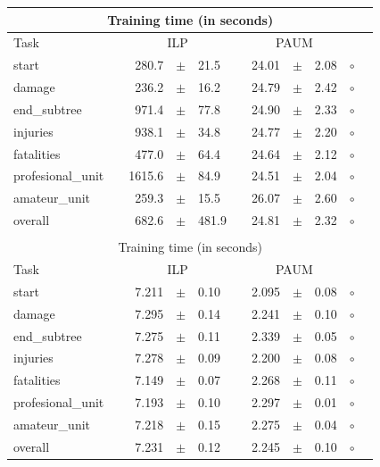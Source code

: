 \begin{table}
\centering 
\begin{tabular}
{lcrclcrcl@{\hspace{0.1cm}}cc}

\multicolumn{11}{c}{Training time (in seconds)}\\
\hline
Task && \multicolumn{3}{c}{ILP}  && \multicolumn{3}{c}{PAUM} && \\
\hline
start              &  & 280.7 &  $\pm$  & 21.5 &  & 24.01 &  $\pm$  & 2.08 &  $\circ$\\
damage             &  & 236.2 &  $\pm$  & 16.2 &  & 24.79 &  $\pm$  & 2.42 &  $\circ$\\
end\_subtree       &  & 971.4 &  $\pm$  & 77.8 &  & 24.90 &  $\pm$  & 2.33 &  $\circ$\\
injuries           &  & 938.1 &  $\pm$  & 34.8 &  & 24.77 &  $\pm$  & 2.20 &  $\circ$\\
fatalities         &  & 477.0 &  $\pm$  & 64.4 &  & 24.64 &  $\pm$  & 2.12 &  $\circ$\\
profesional\_unit  &  & 1615.6 &  $\pm$ & 84.9 &  & 24.51 &  $\pm$  & 2.04 &  $\circ$\\
amateur\_unit      &  & 259.3 &  $\pm$  & 15.5 &  & 26.07 &  $\pm$  & 2.60 &  $\circ$\\
\hline
overall            &  & 682.6 &  $\pm$  & 481.9 & & 24.81 &  $\pm$  & 2.32 &  $\circ$\\
\hline
\\

\multicolumn{11}{c}{Training time (in seconds)}\\
\hline
Task && \multicolumn{3}{c}{ILP}  && \multicolumn{3}{c}{PAUM} && \\
\hline
start              &  & 7.211 &  $\pm$  & 0.10 &  & 2.095 &  $\pm$  & 0.08 &  $\circ$\\
damage             &  & 7.295 &  $\pm$  & 0.14 &  & 2.241 &  $\pm$  & 0.10 &  $\circ$\\
end\_subtree       &  & 7.275 &  $\pm$  & 0.11 &  & 2.339 &  $\pm$  & 0.05 &  $\circ$\\
injuries           &  & 7.278 &  $\pm$  & 0.09 &  & 2.200 &  $\pm$  & 0.08 &  $\circ$\\
fatalities         &  & 7.149 &  $\pm$  & 0.07 &  & 2.268 &  $\pm$  & 0.11 &  $\circ$\\
profesional\_unit  &  & 7.193 &  $\pm$  & 0.10 &  & 2.297 &  $\pm$  & 0.01 &  $\circ$\\
amateur\_unit      &  & 7.218 &  $\pm$  & 0.15 &  & 2.275 &  $\pm$  & 0.04 &  $\circ$\\
\hline
overall            &  & 7.231 &  $\pm$  & 0.12 &  & 2.245 &  $\pm$  & 0.10 &  $\circ$\\
\hline


\end{tabular}
\end{table}
